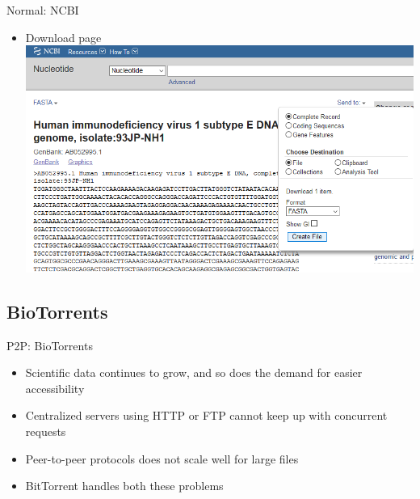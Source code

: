 \documentclass{beamer}
\begin{document}
    \begin{frame}{Normal: NCBI}
        \begin{itemize}
            \item Download page
            \includegraphics[scale=0.5]{ncbi3.png}
        \end{itemize}
    \end{frame}
    
    
    
        \subsection{BioTorrents}
    \begin{frame}{P2P: BioTorrents}
        \begin{itemize}
            \item Scientific data continues to grow, and so does the demand for easier accessibility
            \item Centralized servers using HTTP or FTP cannot keep up with concurrent requests
            \item Peer-to-peer protocols does not scale well for large files
            \item BitTorrent handles both these problems
        \end{itemize}
    \end{frame}
    
\end{document}
